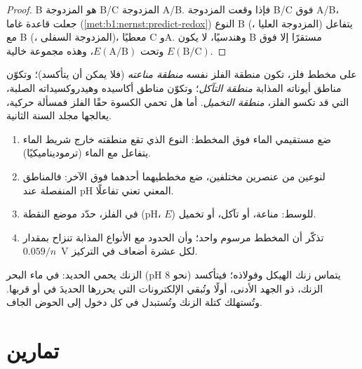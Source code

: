 \begin{proof}
B هو  المزدوجة B/C  المزدوجة A/B. فإذا وقعت المزدوجة B/C
فوق A/B، جعلت قاعدة غاما (\cref{met:b1:nernst:predict-redox}) النوع B
(، المزدوجة العليا) يتفاعل مع B (، المزدوجة السفلى)، معطيًا C
وA. وهندسيًا، لا يكون B مستقرًا إلا فوق $E(\mathrm{B}/\mathrm{C})$
وتحت $E(\mathrm{A}/\mathrm{B})$، وهذه مجموعة خالية.
\end{proof}

\begin{definition}\label{def:b1:e-ph-diagrams:corrosion-domains}
على مخطط فلز، تكون منطقة الفلز نفسه
\emph{منطقة مناعته} (فلا يمكن أن يتأكسد)؛
وتكوّن مناطق أيوناته المذابة \emph{منطقة
التآكل}؛ وتكوّن مناطق أكاسيده
وهيدروكسيداته الصلبة، التي قد تكسو الفلز، \emph{منطقة
التخميل}. أما هل تحمي الكسوة حقًا
الفلز فمسألة حركية، يعالجها مجلد السنة الثانية.
\end{definition}

\begin{method}\label{met:b1:e-ph-diagrams:read}
\begin{enumerate}
  \item ضع مستقيمي الماء فوق المخطط: النوع الذي تقع منطقته خارج
        شريط الماء يتفاعل مع الماء (ترموديناميكيًا).
  \item لنوعين من عنصرين مختلفين، ضع مخططيهما أحدهما فوق الآخر:
        فالمناطق المنفصلة عند pH المعني تعني تفاعلًا.
  \item في الفلز، حدّد موضع النقطة (pH، $E$) للوسط: مناعة، أو
        تآكل، أو تخميل.
  \item تذكّر أن المخطط مرسوم  واحد؛
        وأن الحدود مع الأنواع المذابة تنزاح بمقدار $0.059/n$~V لكل
        عشرة أضعاف في التركيز.
\end{enumerate}
\end{method}

الزنك يحمي الحديد: في ماء البحر (pH نحو 8) يتماس زنك الهيكل
وفولاذه؛ فيتأكسد الزنك، ذو الجهد الأدنى، أولًا وتُبقي
الإلكترونات التي يحررها الحديدَ في  أو قربها.
وتُستهلك كتلة الزنك وتُستبدل في كل دخول إلى الحوض الجاف.

\section{تمارين}

